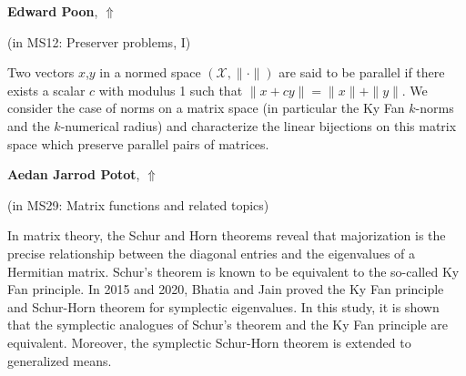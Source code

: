 \documentclass[ILAS2025-program.tex]{subfiles}
\begin{document}
\hypertarget{down0017}{}\begin{ilasabstract}
    
\textbf{Edward Poon},  \hfill \hyperlink{up0017}{$\Uparrow$}
    
    
(in {\color{mstitle}MS12: Preserver problems, I})
        
\mtskip
    Two vectors $x$,$y$ in a normed space $(\mathcal{X}, \| \cdot \|)$ are said to be parallel if there exists a scalar $c$ with modulus 1 such that $\|x+c y\| = \|x\| + \|y\|$.
We consider the case of norms on a matrix space (in particular the Ky Fan $k$-norms and the $k$-numerical radius) and characterize the linear bijections on this matrix space which preserve parallel pairs of matrices.

\end{ilasabstract}
    

\hypertarget{down0048}{}\begin{ilasabstract}
    
\textbf{Aedan Jarrod Potot},  \hfill \hyperlink{up0048}{$\Uparrow$}
    
    
(in {\color{mstitle}MS29: Matrix functions and related topics})
        
\mtskip
    In matrix theory, the Schur and Horn theorems reveal that majorization
is the precise relationship between the diagonal entries and the eigenvalues
of a Hermitian matrix. Schur’s theorem is known to be equivalent to the
so-called Ky Fan principle. In 2015 and 2020, Bhatia and Jain proved the
Ky Fan principle and Schur-Horn theorem for symplectic eigenvalues. In
this study, it is shown that the symplectic analogues of Schur’s theorem and
the Ky Fan principle are equivalent. Moreover, the symplectic Schur-Horn
theorem is extended to generalized means.

\end{ilasabstract}
    
\end{document}
